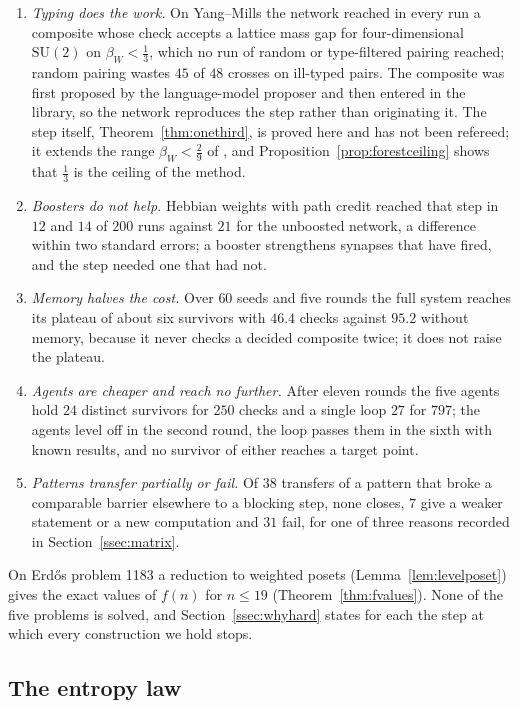 \begin{enumerate}[label=(\roman*),leftmargin=1.8em,itemsep=1pt]
\item \emph{Typing does the work.} On Yang--Mills the network reached in every run a composite whose check accepts a lattice mass gap for four-dimensional $\mathrm{SU}(2)$ on $\beta_{W}<\frac13$, which no run of random or type-filtered pairing reached; random pairing wastes $45$ of $48$ crosses on ill-typed pairs. The composite was first proposed by the language-model proposer and then entered in the library, so the network reproduces the step rather than originating it. The step itself, Theorem~\ref{thm:onethird}, is proved here and has not been refereed; it extends the range $\beta_{W}<\frac29$ of \cite{BB26d}, and Proposition~\ref{prop:forestceiling} shows that $\frac13$ is the ceiling of the method.
\item \emph{Boosters do not help.} Hebbian weights with path credit reached that step in $12$ and $14$ of $200$ runs against $21$ for the unboosted network, a difference within two standard errors; a booster strengthens synapses that have fired, and the step needed one that had not.
\item \emph{Memory halves the cost.} Over $60$ seeds and five rounds the full system reaches its plateau of about six survivors with $46.4$ checks against $95.2$ without memory, because it never checks a decided composite twice; it does not raise the plateau.
\item \emph{Agents are cheaper and reach no further.} After eleven rounds the five agents hold $24$ distinct survivors for $250$ checks and a single loop $27$ for $797$; the agents level off in the second round, the loop passes them in the sixth with known results, and no survivor of either reaches a target point.
\item \emph{Patterns transfer partially or fail.} Of $38$ transfers of a pattern that broke a comparable barrier elsewhere to a blocking step, none closes, $7$ give a weaker statement or a new computation and $31$ fail, for one of three reasons recorded in Section~\ref{ssec:matrix}.
\end{enumerate}
On Erd\H{o}s problem 1183 a reduction to weighted posets (Lemma~\ref{lem:levelposet}) gives the exact values of $f(n)$ for $n\le19$ (Theorem~\ref{thm:fvalues}). None of the five problems is solved, and Section~\ref{ssec:whyhard} states for each the step at which every construction we hold stops.

\subsection{The entropy law}

